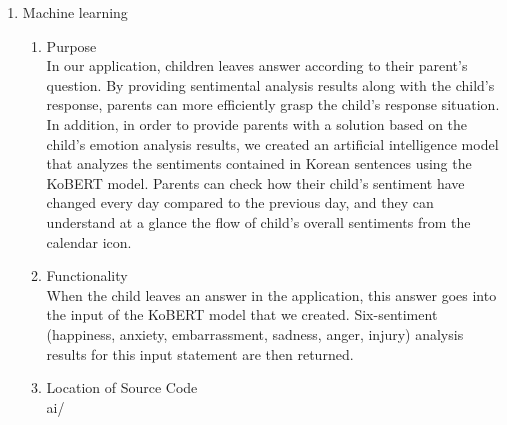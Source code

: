 \documentclass[conference]{IEEEtran}
\begin{document}
\begin{enumerate}
\begin{enumerate}
        \end{enumerate}
    \vspace{0.5cm}
    \item Machine learning
        \begin{enumerate}
            \item Purpose
            \\In our application, children leaves answer according to their parent’s question. By providing sentimental analysis results along with the child's response, parents can more efficiently grasp the child's response situation. In addition, in order to provide parents with a solution based on the child's emotion analysis results, we created an artificial intelligence model that analyzes the sentiments contained in Korean sentences using the KoBERT model. Parents can check how their child's sentiment have changed every day compared to the previous day, and they can understand at a glance the flow of child's overall sentiments from the calendar icon.\newline
            
            \item Functionality
            \\When the child leaves an answer in the application, this answer goes into the input of the KoBERT model that we created. Six-sentiment (happiness, anxiety, embarrassment, sadness, anger, injury) analysis results for this input statement are then returned.\newline
            
            \item Location of Source Code
            \\ai/\newline
            

\end{enumerate}
\end{enumerate}
\end{document}
